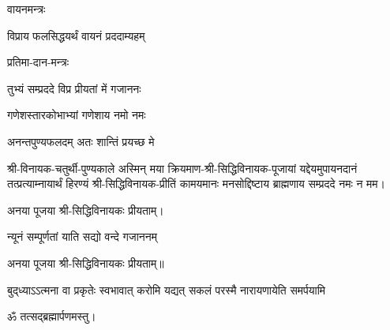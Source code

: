 \begin{center}
\centerline{वायनमन्त्रः}

{विप्राय फलसिद्धयर्थं वायनं प्रददाम्यहम्} 

\centerline{प्रतिमा-दान-मन्त्रः}

{तुभ्यं सम्प्रददे विप्र प्रीयतां में गजाननः}

{गणेशस्तारकोभाभ्यां गणेशाय नमो नमः}

{अनन्तपुण्यफलदम् अतः शान्तिं प्रयच्छ मे}

श्री-विनायक-चतुर्थी-पुण्यकाले अस्मिन् मया क्रियमाण-श्री-सिद्धिविनायक-पूजायां
यद्देयमुपायनदानं तत्प्रत्याम्नायार्थं हिरण्यं श्री-सिद्धिविनायक-प्रीतिं
कामयमानः मनसोद्दिष्टाय ब्राह्मणाय सम्प्रददे नमः न मम।

अनया पूजया श्री-सिद्धिविनायकः प्रीयताम्। 

\end{center}







{न्यूनं सम्पूर्णतां याति सद्यो वन्दे गजाननम्} 

अनया पूजया श्री-सिद्धिविनायकः प्रीयताम्॥ 

{बुद्‌ध्याऽऽत्मना वा प्रकृतेः स्वभावात्}
{करोमि यद्यत् सकलं परस्मै}
{नारायणायेति समर्पयामि}

ॐ तत्सद्ब्रह्मार्पणमस्तु।




